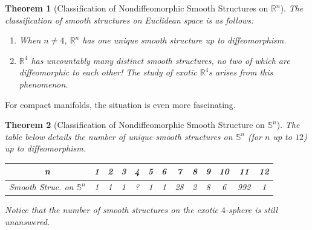 \documentclass{article}
\newtheorem{theorem}{Theorem}[section]
\theoremstyle{remark}
\theoremstyle{definition}
\begin{document}
\begin{theorem}[Classification of Nondiffeomorphic Smooth Structures on $\mathbb{R}^n$]
The classification of smooth structures on Euclidean space is as follows: 
\begin{enumerate}
    \item When $n \neq 4$, $\mathbb{R}^n$ has one unique smooth structure up to diffeomorphism.
    \item $\mathbb{R}^4$ has uncountably many distinct smooth structures, no two of which are diffeomorphic to each other! The study of \textit{exotic $\mathbb{R}^4$}s arises from this phenomenon. 
\end{enumerate}
\end{theorem}

For compact manifolds, the situation is even more fascinating.

\begin{theorem}[Classification of Nondiffeomorphic Smooth Structure on $\mathbb{S}^n$]
The table below details the number of unique smooth structures on $\mathbb{S}^n$ (for $n$ up to $12$) up to diffeomorphism. 
\begin{center}
\begin{tabular}{c|c|c|c|c|c|c|c|c|c|c|c|c}
    n & 1 & 2&3&4&5&6&7&8&9&10&11&12 \\
    \hline
    Smooth Struc. on $\mathbb{S}^n$ & 1&1&1&?&1&1&28&2&8&6&992&1
\end{tabular}
\end{center}

Notice that the number of smooth structures on the exotic $4$-sphere is still unanswered. 
\end{theorem}
\end{document}
